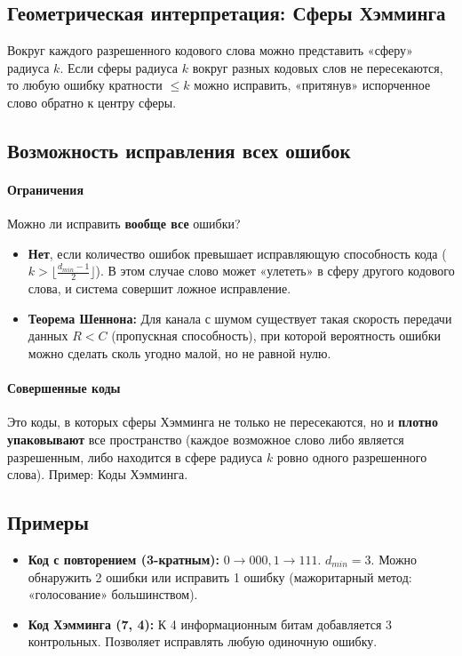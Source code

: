 \subsection*{Геометрическая интерпретация: Сферы Хэмминга}
Вокруг каждого разрешенного кодового слова можно представить «сферу» радиуса $k$. Если сферы радиуса $k$ вокруг разных кодовых слов не пересекаются, то любую ошибку кратности $\le k$ можно исправить, «притянув» испорченное слово обратно к центру сферы.

\subsection*{Возможность исправления всех ошибок}

\paragraph{Ограничения}
Можно ли исправить \textbf{вообще все} ошибки? 
\begin{itemize}
    \item \textbf{Нет}, если количество ошибок превышает исправляющую способность кода ($k > \lfloor \frac{d_{min}-1}{2} \rfloor$). В этом случае слово может «улететь» в сферу другого кодового слова, и система совершит ложное исправление.
    \item \textbf{Теорема Шеннона:} Для канала с шумом существует такая скорость передачи данных $R < C$ (пропускная способность), при которой вероятность ошибки можно сделать сколь угодно малой, но не равной нулю.
\end{itemize}

\paragraph{Совершенные коды}
Это коды, в которых сферы Хэмминга не только не пересекаются, но и \textbf{плотно упаковывают} все пространство (каждое возможное слово либо является разрешенным, либо находится в сфере радиуса $k$ ровно одного разрешенного слова). Пример: Коды Хэмминга.

\subsection*{Примеры}
\begin{itemize}
    \item \textbf{Код с повторением (3-кратным):} $0 \to 000, 1 \to 111$. 
    $d_{min}=3$. Можно обнаружить 2 ошибки или исправить 1 ошибку (мажоритарный метод: «голосование» большинством).
    \item \textbf{Код Хэмминга (7, 4):} К 4 информационным битам добавляется 3 контрольных. Позволяет исправлять любую одиночную ошибку.
\end{itemize}